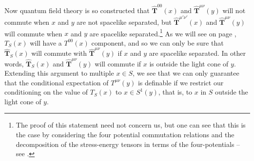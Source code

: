 Now quantum field theory is so constructed that $\hat{\bm{T}}^{{00}}(x)$ and $\hat{\bm{T}}^{{\mu\nu}}(y)$ will not commute when $x$ and $y$ are not spacelike separated, but $\hat{\bm{T}}^{{\mu'\nu'}}(x)$ and $\hat{\bm{T}}^{{\mu\nu}}(y)$ will commute when $x$ and $y$ are spacelike separated.\footnote{The proof of this statement need not concern us, but one can see that this is the case by considering the four potential commutation relations and the decomposition of the stress-energy tensors in terms of the four-potentials  -- see \cite[p. 1443--1444]{SchwingerJulianI}.} As we will see on page \pageref{TSdef}, $T_S(x)$ will have a $T^{00}(x)$ component, and so we can only be sure that $\hat{\bm{T}}_S(x)$ will commute with  $\hat{\bm{T}}^{{\mu\nu}}(y)$ if $x$ and $y$ are spacelike separated. In other words, $\hat{\bm{T}}_S(x)$ and $\hat{\bm{T}}^{{\mu\nu}}(y)$ will commute if $x$ is outside the light cone of $y$. Extending this argument to multiple $x\in S$, we see that we can only guarantee that the conditional expectation of $T^{\mu\nu}(y)$ is definable if we restrict our conditioning on the value of $T_S(x)$ to $x\in S^1(y)$, that is, to $x$ in $S$ outside the light cone of $y$.

